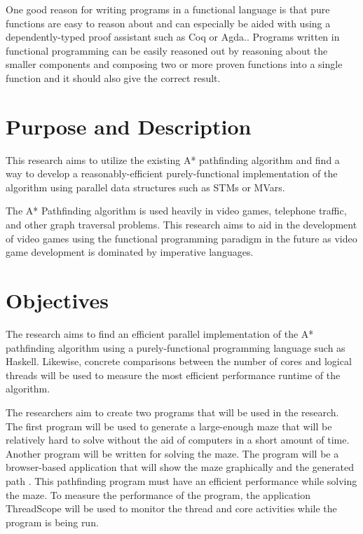 One good reason for writing programs in a functional language is that 
pure functions are easy to reason about and can especially be aided with 
using a dependently-typed proof assistant such as Coq
or Agda.\cite{Breitner2018,SpectorZabusky2018,ElBakouny2017}.
Programs written in functional programming can be easily reasoned out 
by reasoning about the smaller components and composing two or more proven 
functions into a single function and it should also give the correct result. \cite{AbelBenkeBove2005}

\section{Purpose and Description}

This research aims to utilize the existing A* pathfinding algorithm
\cite{ZaghloulAlJami2017,WeinstockHolladay}
and find a way to develop a reasonably-efficient purely-functional 
implementation of the algorithm using parallel data structures such 
as STMs or MVars\cite{Marlow2013}.  

The A* Pathfinding algorithm is used heavily in video games, telephone traffic, 
and other graph traversal problems\cite{HartNilssonRaphael1968}. This research 
aims to aid in the development of video games using the functional 
programming paradigm in the future as video game development is dominated 
by imperative languages.

\section{Objectives}
The research aims to find an efficient parallel implementation of the A* pathfinding 
algorithm using a purely-functional programming language such as Haskell. Likewise, 
concrete comparisons between the number of cores and logical threads will be used to measure 
the most efficient performance runtime of the algorithm.

The researchers aim to create two programs that will be used in the research. The first program 
will be used to generate a large-enough maze that will be relatively hard to solve without the aid
of computers in a short amount of time. Another program will be written for solving the maze. The
program will be a browser-based application that will show the maze graphically and the generated 
path . This pathfinding program must have an efficient performance while solving the maze. To measure 
the performance of the program, the application ThreadScope will be used to monitor the thread and
core activities while the program is being run. \cite{ThreadScope}
